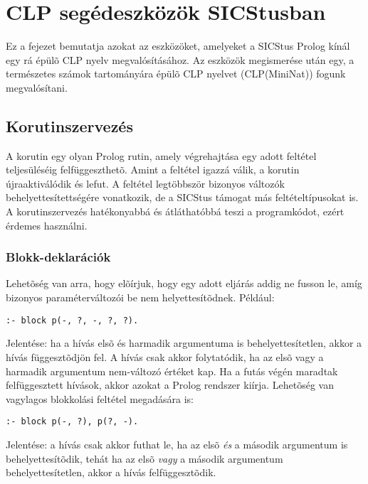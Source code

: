 \clearpage

\section{CLP segédeszközök SICStusban}

Ez a fejezet bemutatja azokat az eszközöket, amelyeket a SICStus Prolog
kínál egy rá épülõ CLP nyelv megvalósításához. Az eszközök megismerése után
egy, a természetes számok tartományára épülõ CLP nyelvet (CLP(MiniNat))
fogunk megvalósítani.

\subsection{Korutinszervezés}

A korutin egy olyan Prolog rutin, amely végrehajtása egy adott feltétel
teljesüléséig felfüggeszthetõ. Amint a feltétel igazzá válik, a korutin
újraaktiválódik és lefut. A feltétel legtöbbször bizonyos változók
behelyettesítettségére vonatkozik, de a SICStus támogat más feltételtípusokat
is. A korutinszervezés hatékonyabbá és átláthatóbbá teszi a programkódot,
ezért érdemes használni.

\subsubsection{Blokk-deklarációk}

Lehetõség van arra, hogy elõírjuk, hogy egy adott eljárás addig ne fusson
le, amíg bizonyos paraméterváltozói be nem helyettesítõdnek. Például:

\begin{verbatim}
:- block p(-, ?, -, ?, ?).
\end{verbatim}

Jelentése: ha a  hívás elsõ és harmadik argumentuma is
behelyettesítetlen, akkor a hívás függesztõdjön fel. A hívás csak akkor
folytatódik, ha az elsõ vagy a harmadik argumentum nem-változó értéket
kap. Ha a futás végén maradtak felfüggesztett hívások, akkor azokat a Prolog
rendszer kiírja. Lehetõség van vagylagos blokkolási feltétel megadására is:

\begin{verbatim}
:- block p(-, ?), p(?, -).
\end{verbatim}

Jelentése: a  hívás csak akkor futhat le, ha az elsõ \emph{és} a
második argumentum is behelyettesítõdik, tehát ha az elsõ \emph{vagy} a
második argumentum behelyettesítetlen, akkor a hívás felfüggesztõdik.

